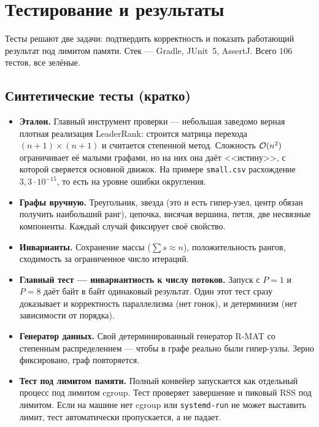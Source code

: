 \section{Тестирование и результаты}
\label{sec:testing}

Тесты решают две задачи: подтвердить корректность и показать работающий результат под лимитом памяти.
Стек --- Gradle, JUnit~5, AssertJ. Всего $106$ тестов, все зелёные.

\subsection{Синтетические тесты (кратко)}
\begin{itemize}[itemsep=3pt]
  \item \textbf{Эталон.} Главный инструмент проверки --- небольшая заведомо верная плотная реализация
        LeaderRank: строится матрица перехода $(n{+}1)\times(n{+}1)$ и считается степенной метод.
        Сложность $\mathcal{O}(n^2)$ ограничивает её малыми графами, но на них она даёт <<истину>>, с
        которой сверяется основной движок. На примере \texttt{small.csv} расхождение
        $3{,}3\cdot10^{-15}$, то есть на уровне ошибки округления.
  \item \textbf{Графы вручную.} Треугольник, звезда (это и есть гипер-узел, центр обязан получить
        наибольший ранг), цепочка, висячая вершина, петля, две несвязные компоненты. Каждый случай
        фиксирует своё свойство.
  \item \textbf{Инварианты.} Сохранение массы ($\sum s\approx n$), положительность рангов, сходимость
        за ограниченное число итераций.
  \item \textbf{Главный тест --- инвариантность к числу потоков.} Запуск с $P=1$ и $P=8$ даёт байт в
        байт одинаковый результат. Один этот тест сразу доказывает и корректность параллелизма (нет
        гонок), и детерминизм (нет зависимости от порядка).
  \item \textbf{Генератор данных.} Свой детерминированный генератор R-MAT со степенным распределением
        --- чтобы в графе реально были гипер-узлы. Зерно фиксировано, граф повторяется.
  \item \textbf{Тест под лимитом памяти.} Полный конвейер запускается как отдельный процесс под
        лимитом cgroup. Тест проверяет завершение и пиковый RSS под лимитом. Если на машине нет cgroup
        или \texttt{systemd-run} не может выставить лимит, тест автоматически пропускается, а не
        падает.
\end{itemize}

